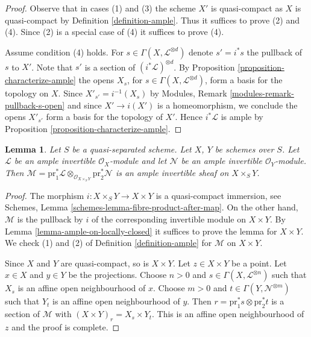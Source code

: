 \documentclass{stacks-project}
\theoremstyle{plain}
\newtheorem{lemma}[subsection]{Lemma}
\theoremstyle{definition}
\theoremstyle{remark}
\numberwithin{equation}{subsection}
\begin{document}
\begin{proof}
Observe that in cases (1) and (3) the scheme $X'$ is quasi-compact
as $X$ is quasi-compact by Definition \ref{definition-ample}.
Thus it suffices to prove (2) and (4). Since (2) is a special case
of (4) it suffices to prove (4).

\medskip\noindent
Assume condition (4) holds. For $s \in \Gamma(X, \mathcal{L}^{\otimes d})$
denote $s' = i^*s$ the pullback of $s$ to $X'$. Note that
$s'$ is a section of $(i^*\mathcal{L})^{\otimes d}$. By
Proposition \ref{proposition-characterize-ample}
the opens $X_s$, for $s \in \Gamma(X, \mathcal{L}^{\otimes d})$,
form a basis for the topology on $X$. Since $X'_{s'} = i^{-1}(X_s)$ by
Modules, Remark \ref{modules-remark-pullback-s-open}
and since $X' \to i(X')$ is a homeomorphism, we conclude
the opens $X'_{s'}$ form a basis for the topology of $X'$. Hence
$i^*\mathcal{L}$ is ample by
Proposition \ref{proposition-characterize-ample}.
\end{proof}

\begin{lemma}
\label{lemma-ample-on-product}
Let $S$ be a quasi-separated scheme. Let $X$, $Y$ be schemes over $S$.
Let $\mathcal{L}$ be an ample invertible $\mathcal{O}_X$-module
and let $\mathcal{N}$ be an ample invertible $\mathcal{O}_Y$-module.
Then $\mathcal{M} = \text{pr}_1^*\mathcal{L}
\otimes_{\mathcal{O}_{X \times_S Y}} \text{pr}_2^*\mathcal{N}$
is an ample invertible sheaf on $X \times_S Y$.
\end{lemma}

\begin{proof}
The morphism $i : X \times_S Y \to X \times Y$ is a quasi-compact
immersion, see Schemes, Lemma \ref{schemes-lemma-fibre-product-after-map}.
On the other hand, $\mathcal{M}$ is the pullback by
$i$ of the corresponding invertible module on $X \times Y$.
By Lemma \ref{lemma-ample-on-locally-closed} it suffices to prove the
lemma for $X \times Y$. We check (1) and (2) of
Definition \ref{definition-ample} for $\mathcal{M}$ on $X \times Y$.

\medskip\noindent
Since $X$ and $Y$ are quasi-compact, so is $X \times Y$.
Let $z \in X \times Y$ be a point. Let $x \in X$ and $y \in Y$
be the projections. Choose $n > 0$ and
$s \in \Gamma(X, \mathcal{L}^{\otimes n})$
such that $X_s$ is an affine open neighbourhood of $x$.
Choose $m > 0$ and
$t \in \Gamma(Y, \mathcal{N}^{\otimes m})$
such that $Y_t$ is an affine open neighbourhood of $y$.
Then $r = \text{pr}_1^*s \otimes \text{pr}_2^*t$ is a section
of $\mathcal{M}$ with $(X \times Y)_r = X_s \times Y_t$.
This is an affine open neighbourhood of $z$ and the proof is complete.
\end{proof}
\end{document}
